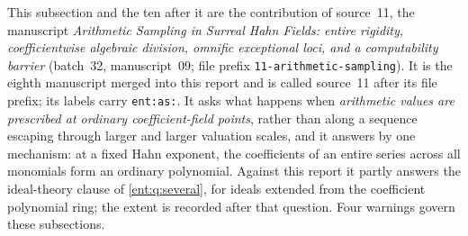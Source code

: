 \documentclass[11pt]{article}
\theoremstyle{plain}
\theoremstyle{plain}
\theoremstyle{plain}
\theoremstyle{definition}
\theoremstyle{definition}
\theoremstyle{definition}
\theoremstyle{definition}
\theoremstyle{remark}
\begin{document}
This subsection and the ten after it are the contribution of source~11, the
manuscript \emph{Arithmetic Sampling in Surreal Hahn Fields: entire rigidity,
coefficientwise algebraic division, omnific exceptional loci, and a
computability barrier} (batch~32, manuscript~09; file prefix
\texttt{11-arithmetic-sampling}). It is the eighth manuscript merged into this
report and is called source~11 after its file prefix; its labels carry
\texttt{ent:as:}. It asks what happens when \emph{arithmetic values are
prescribed at ordinary coefficient-field points}, rather than along a
sequence escaping through larger and larger valuation scales, and it answers
by one mechanism: at a fixed Hahn exponent, the coefficients of an entire
series across all monomials form an ordinary polynomial. Against this report
it partly answers the ideal-theory clause of \cref{ent:q:several}, for ideals
extended from the coefficient polynomial ring; the extent is recorded after
that question. Four warnings govern these subsections.
\end{document}
